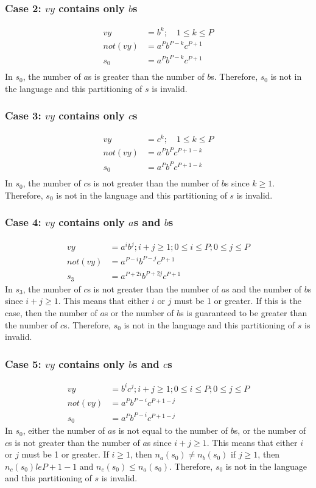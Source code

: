 \documentclass{assignment-x}
\begin{document}
\subsubsection{Case 2: $vy$ contains only $b$s}
\begin{align*}
    vy      & =b^k;\quad 1 \le k \le P \\
    not(vy) & = a^Pb^{P-k}c^{P+1}      \\
    s_0     & = a^Pb^{P-k}c^{P+1}      \\
\end{align*}
In $s_0$, the number of $a$s is greater than the number of $b$s. Therefore, $s_0$ is not in the language and this partitioning of $s$ is invalid.
\subsubsection{Case 3: $vy$ contains only $c$s}
\begin{align*}
    vy      & =c^k;\quad 1 \le k \le P \\
    not(vy) & = a^Pb^Pc^{P+1-k}        \\
    s_0     & = a^Pb^Pc^{P+1-k}        \\
\end{align*}
In $s_0$, the number of $c$s is not greater than the number of $b$s since $k \ge 1$. Therefore, $s_0$ is not in the language and this partitioning of $s$ is invalid.
\subsubsection{Case 4: $vy$ contains only $a$s and $b$s}
\begin{align*}
    vy      & =a^ib^j; i+j \ge 1; 0 \le i \le P; 0 \le j \le P \\
    not(vy) & = a^{P-i}b^{P-j}c^{P+1}                          \\
    s_3     & = a^{P+2i}b^{P+2j}c^{P+1}
\end{align*}
In $s_3$, the number of $c$s is not greater than the number of $a$s and the number of $b$s since $i+j \ge 1$. This means that either $i$ or $j$ must be 1 or greater. If this is the case, then the number of $a$s or the number of $b$s is guaranteed to be greater than the number of $c$s. Therefore, $s_0$ is not in the language and this partitioning of $s$ is invalid.
\subsubsection{Case 5: $vy$ contains only $b$s and $c$s}
\begin{align*}
    vy      & =b^ic^j; i+j \ge 1; 0 \le i \le P; 0 \le j \le P \\
    not(vy) & = a^Pb^{P-i}c^{P+1-j}                            \\
    s_0     & = a^Pb^{P-i}c^{P+1-j}
\end{align*}
In $s_0$, either the number of $a$s is not equal to the number of $b$s, or the number of $c$s is not greater than the number of $a$s since $i+j \ge 1$. This means that either $i$ or $j$ must be 1 or greater. If $i \ge 1$, then $n_a(s_0) \ne n_b(s_0)$ if $j \ge 1$, then $n_c(s_0) le P+1-1$ and $n_c(s_0) \le n_a(s_0)$. Therefore, $s_0$ is not in the language and this partitioning of $s$ is invalid.
\end{document}
